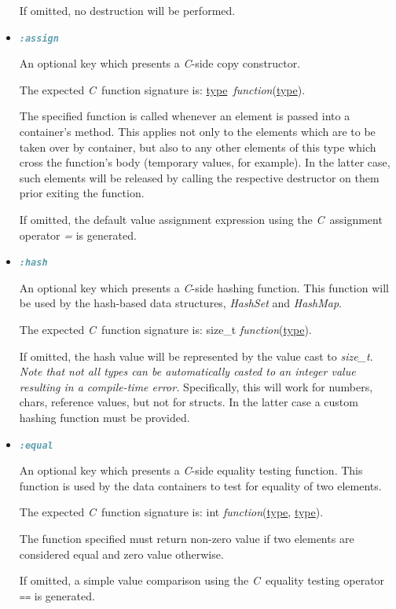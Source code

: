 \documentclass[a4paper]{article}
\newcommand{\C}{\emph{C}}
\newcommand{\st}{\underline{type}}
\newcommand{\meth}[1]{#1}
\begin{document}
\begin{itemize}
If omitted, no destruction will be performed.


\item \lstinline[language=Ruby]!:assign!


An optional key which presents a \C-side copy constructor.


The expected \C\ function signature is: \meth{\st\ \emph{function}(\st)}.


The specified function is called whenever an element is passed into a container's method.
This applies not only to the elements which are to be taken over by container, but also to any other elements of this type which cross the function's body (temporary values, for example).
In the latter case, such elements will be released by calling the respective destructor on them prior exiting the function.


If omitted, the default value assignment expression using the \C\ assignment operator \emph{=} is generated.


\item \lstinline[language=Ruby]!:hash!


An optional key which presents a \C-side hashing function.
This function will be used by the hash-based data structures, \emph{HashSet} and \emph{HashMap}.


The expected \C\ function signature is: \meth{size\_t \emph{function}(\st)}.


If omitted, the hash value will be represented by the value cast to \emph{size\_t}.
\emph{Note that not all types can be automatically casted to an integer value resulting in a compile-time error.}
Specifically, this will work for numbers, chars, reference values, but not for structs.
In the latter case a custom hashing function must be provided.


\item \lstinline[language=Ruby]!:equal!


An optional key which presents a \C-side equality testing function.
This function is used by the data containers to test for equality of two elements.


The expected \C\ function signature is: \meth{int \emph{function}(\st, \st)}.


The function specified must return non-zero value if two elements are considered equal and zero value otherwise.


If omitted, a simple value comparison using the \C\ equality testing operator \lstinline[language=C]!==! is generated.


\end{itemize}
\end{document}
